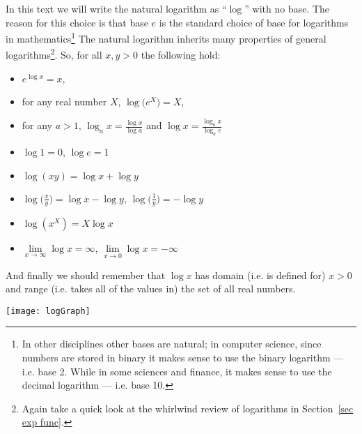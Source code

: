 In this text we will write the natural logarithm as ``$\log$'' with no base.
The reason for this choice is that base $e$ is the standard choice of base for
logarithms in mathematics\footnote{In other disciplines other bases are
natural; in computer science, since numbers are stored in binary it makes sense
to use the binary logarithm --- i.e. base 2. While in some sciences and finance, it makes
sense to use the decimal logarithm --- i.e. base 10.}
The natural logarithm inherits many properties of general
logarithms\footnote{Again take a quick look at the whirlwind review of
logarithms in Section~\ref{sec exp func}.}. So, for all $x,y>0$ the following
hold:
\begin{itemize}
\item $e^{\log x}=x$,
\item for any real number $X$, $\log \big(e^X\big)=X$,
\item for any $a>1$, $\log_a x=\tfrac{\log x}{\log a}$ and $\log
x=\tfrac{\log_a x}{\log_a e}$
\item $\log 1=0$, $\log e=1$
\item $\log(xy)=\log x+\log y$
\item $\log\big(\tfrac{x}{y}\big)=\log x-\log y$,
      $\log\big(\tfrac{1}{y}\big)=-\log y$
\item $\log(x^X)=X\log x$
\item $\lim\limits_{x\rightarrow\infty}\log x=\infty$,
           $\lim\limits_{x\rightarrow0}\log x=-\infty$
\end{itemize}
And finally we should remember that $\log x$ has domain (i.e. is defined for) $x > 0$ and
range (i.e. takes all of the values in) the set of all real numbers.
\begin{fig}
\begin{center}
   \texttt{[image: logGraph]}
\end{center}
\end{fig}


